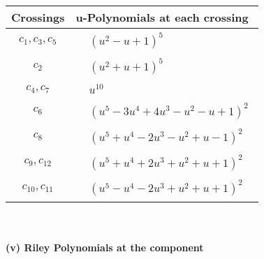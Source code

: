 \documentclass[1p]{elsarticle_modified}
\theoremstyle{definition}
\begin{document}
\begin{tabular}{m{50pt}|m{274pt}}
Crossings & \hspace{64pt}u-Polynomials at each crossing \\
\hline $$\begin{aligned}c_{1},c_{3},c_{5}\end{aligned}$$&$\begin{aligned}
&(u^2- u+1)^5
\end{aligned}$\\
\hline $$\begin{aligned}c_{2}\end{aligned}$$&$\begin{aligned}
&(u^2+u+1)^5
\end{aligned}$\\
\hline $$\begin{aligned}c_{4},c_{7}\end{aligned}$$&$\begin{aligned}
&u^{10}
\end{aligned}$\\
\hline $$\begin{aligned}c_{6}\end{aligned}$$&$\begin{aligned}
&(u^5-3 u^4+4 u^3- u^2- u+1)^2
\end{aligned}$\\
\hline $$\begin{aligned}c_{8}\end{aligned}$$&$\begin{aligned}
&(u^5+u^4-2 u^3- u^2+u-1)^2
\end{aligned}$\\
\hline $$\begin{aligned}c_{9},c_{12}\end{aligned}$$&$\begin{aligned}
&(u^5+u^4+2 u^3+u^2+u+1)^2
\end{aligned}$\\
\hline $$\begin{aligned}c_{10},c_{11}\end{aligned}$$&$\begin{aligned}
&(u^5- u^4-2 u^3+u^2+u+1)^2
\end{aligned}$\\
\hline
\end{tabular}\\~\\
\newpage\renewcommand{\arraystretch}{1}
\flushleft \textbf{(v) Riley Polynomials at the component}\newline \\
\end{document}
